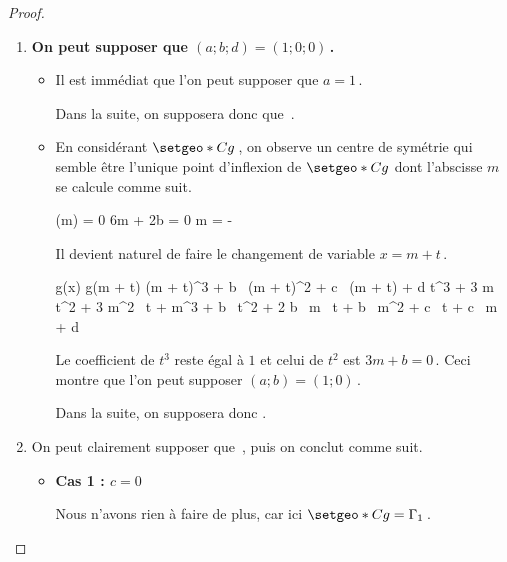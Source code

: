 \begin{proof}
	\leavevmode
	\begin{enumerate}
		\item \textbf{On peut supposer que $(a ; b ; d) = (1 ; 0 ; 0)$\,.}
		\begin{itemize}
			\item Il est immédiat que l'on peut supposer que $a = 1$\,. 
				          
			Dans la suite, on supposera donc que \,.

			\item En considérant $\setgeo*{C}{g}$\,, on observe un centre de symétrie qui semble être l'unique point d'inflexion de $\setgeo*{C}{g}$ dont l'abscisse $m$ se calcule comme suit.
					      
			\smallskip
			\noindent\kern-5pt
			\begin{stepcalc}[style = sar, ope = \iff]
				(m) = 0
			\explnext{}
				6m + 2b = 0
			\explnext{}
				m = - 
			\end{stepcalc}
					      
			\smallskip
			\noindent
			Il devient naturel de faire le changement de variable $x = m + t$\,.
			
			\smallskip
			\noindent\kern-5pt
			\begin{stepcalc}[style = sar]
				g(x)
				\explnext{}
				g(m + t)
				\explnext{}
				(m + t)^3 + b \, (m + t)^2 + c \, (m + t) + d
				\explnext{}
				  t^3 + 3 m \, t^2 + 3 m^2 \, t    + m^3
			          + b \, t^2   + 2 b \, m \, t + b \, m^2
				                   + c \, t        + c \, m + d
			\end{stepcalc} 
			
			\smallskip
			\noindent
			Le coefficient de $t^3$ reste égal à $1$ et celui de $t^2$ est $3m + b = 0$\,. Ceci montre que l'on peut supposer $(a ; b) = (1 ; 0)$\,.
			
			Dans la suite, on supposera donc .
		\end{itemize}




		\newpage
		\item On peut clairement supposer que \,, puis on conclut comme suit.
		\begin{itemize}
			\item \textbf{Cas 1 : $c = 0$}
		
			\smallskip
			\noindent
			Nous n'avons rien à faire de plus, car ici $\setgeo*{C}{g} = \Gamma_1$\,.



\end{itemize}
\end{enumerate}
\end{proof}
